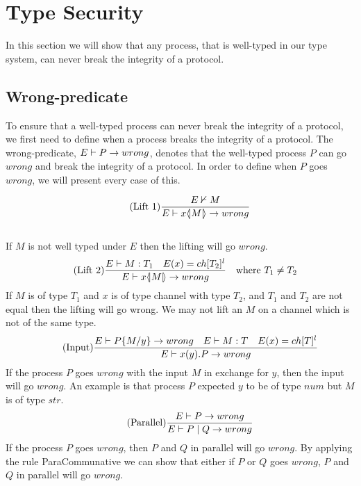 \section{Type Security}
In this section we will show that any process, that is well-typed in our type system, can never break the integrity of a protocol.
\subsection{Wrong-predicate}
To ensure that a well-typed process can never break the integrity of a protocol, we first need to define when a process breaks the integrity of a protocol.
The wrong-predicate, $E \vdash P \rightarrow wrong$, denotes that the well-typed process $P$ can go $wrong$ and break the integrity of a protocol. In order to define when $P$ goes $wrong$, we will present every case of this.

    \begin{align*}
        \tag{Lift 1}\frac{E \nvdash M}{E \vdash x \langle \! | M | \! \rangle \rightarrow wrong}
    \end{align*}\\
    If $M$ is not well typed under $E$ then the lifting will go $wrong$.\\
        
    \begin{align*}
            \tag{Lift 2}\frac{E \vdash M:T_1 \quad E(x)=ch[T_2]^l}{E \vdash x \langle \! | M | \! \rangle \rightarrow wrong} &\quad \text{where}\ T_1 \neq T_2
    \end{align*}
    If $M$ is of type $T_1$ and $x$ is of type channel with type $T_2$, and $T_1$ and $T_2$ are not equal then the lifting will go wrong. We may not lift an $M$ on a channel which is not of the same type.\\

    \begin{align*}
        \tag{Input}\frac{E \vdash P\{ M/ y\} \rightarrow wrong \quad E \vdash M:T \quad E(x)= ch[T]^l} {E \vdash x(y).P \rightarrow wrong}\\
    \end{align*}
    If the process $P$ goes $wrong$ with the input $M$ in exchange for $y$, then the input will go $wrong$. An example is that process $P$ expected $y$ to be of type $num$ but $M$ is of type $str$.\\

    \begin{align*}
        \tag{Parallel}\frac{E \vdash P \rightarrow wrong}{E \vdash P \mid Q \rightarrow wrong}
    \end{align*}
    If the process $P$ goes $wrong$, then $P$ and $Q$ in parallel will go $wrong$. By applying the rule ParaCommunative we can show that either if $P$ or $Q$ goes $wrong$, $P$ and $Q$ in parallel will go $wrong$.\\

